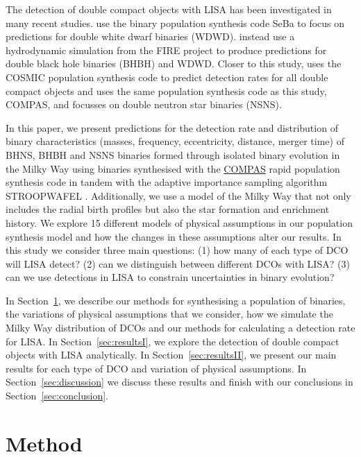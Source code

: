 \documentclass[twocolumn]{aastex63}
\begin{document}
The detection of double compact objects with LISA has been investigated in many recent studies. \citet{Korol+2017, Korol+2020} use the binary population synthesis code SeBa to focus on predictions for double white dwarf binaries (WDWD). \citet{Lamberts+2018, Lamberts+2019} instead use a hydrodynamic simulation from the FIRE project \citep{Hopkins+2014} to produce predictions for double black hole binaries (BHBH) and WDWD. Closer to this study, \citet{Breivik+2019} uses the COSMIC population synthesis code to predict detection rates for all double compact objects and \citet{Lau+2020} uses the same population synthesis code as this study, COMPAS, and focusses on double neutron star binaries (NSNS).

In this paper, we present predictions for the detection rate and distribution of binary characteristics (masses, frequency, eccentricity, distance, merger time) of BHNS, BHBH and NSNS binaries formed through isolated binary evolution in the Milky Way using binaries synthesised with the \href{https://compas.science}{COMPAS} rapid population synthesis code \citep{Stevenson+2017, Vigna-Gomez+2018, Stevenson+2019} in tandem with the adaptive importance sampling algorithm STROOPWAFEL \citep{Broekgaarden+2019}. Additionally, we use a model of the Milky Way that not only includes the radial birth profiles but also the star formation and enrichment history. We explore 15 different models of physical assumptions in our population synthesis model and how the changes in these assumptions alter our results. In this study we consider three main questions: (1) how many of each type of DCO will LISA detect? (2) can we distinguish between different DCOs with LISA? (3) can we use detections in LISA to constrain uncertainties in binary evolution?

In Section~\ref{sec:method}, we describe our methods for synthesising a population of binaries, the variations of physical assumptions that we consider, how we simulate the Milky Way distribution of DCOs and our methods for calculating a detection rate for LISA. In Section~\ref{sec:resultsI}, we explore the detection of double compact objects with LISA analytically. In Section~\ref{sec:resultsII}, we present our main results for each type of DCO and variation of physical assumptions. In Section~\ref{sec:discussion} we discuss these results and finish with our conclusions in Section~\ref{sec:conclusion}.

\section{Method} \label{sec:method}
\end{document}
